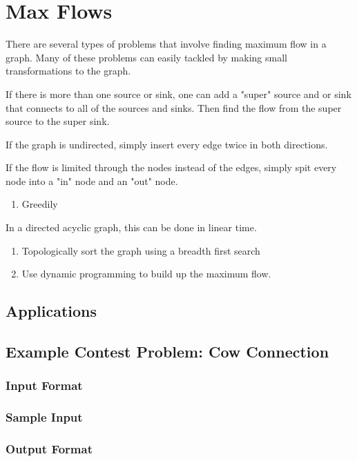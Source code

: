 \section{Max Flows}
There are several types of problems that involve finding maximum flow in a graph.
Many of these problems can easily tackled by making small transformations to the graph.


If there is more than one source or sink,  one can add a "super" source and or sink that connects to all of the sources and sinks.
Then find the flow from the super source to the super sink.


If the graph is undirected, simply insert every edge twice in both directions.


If the flow is limited through the nodes instead of the edges, simply spit every node into a "in" node and an "out" node.



\begin{enumerate}
	\item Greedily
\end{enumerate}

In a directed acyclic graph, this can be done in linear time.

\begin{enumerate}
	\item Topologically sort the graph using a breadth first search
	\item Use dynamic programming to build up the maximum flow.
\end{enumerate}

\subsection{Applications}
\subsection{Example Contest Problem: Cow Connection}
\subsubsection{Input Format}
\subsubsection{Sample Input}
\subsubsection{Output Format}
